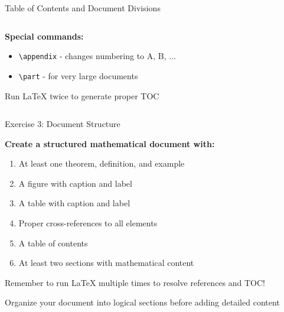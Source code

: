 \begin{frame}[fragile]{Table of Contents and Document Divisions}
\begin{columns}
\begin{column}{0.5\textwidth}
               \textbf{Special commands:}
               \begin{itemize}
                    \item \texttt{\textbackslash appendix} - changes numbering to A, B, ...
                    \item \texttt{\textbackslash part} - for very large documents
               \end{itemize}
               
               \begin{tip}
                    Run LaTeX twice to generate proper TOC
               \end{tip}
          \end{column}
     \end{columns}
\end{frame}

\begin{frame}{Exercise 3: Document Structure}
     \begin{practice}
          \textbf{Create a structured mathematical document with:}
          \begin{enumerate}
               \item At least one theorem, definition, and example
               \item A figure with caption and label 
               \item A table with caption and label
               \item Proper cross-references to all elements
               \item A table of contents
               \item At least two sections with mathematical content
          \end{enumerate}
     \end{practice}
     
     \begin{warning}
          Remember to run LaTeX multiple times to resolve references and TOC!
     \end{warning}
     
     \begin{tip}
          Organize your document into logical sections before adding detailed content
     \end{tip}
\end{frame}